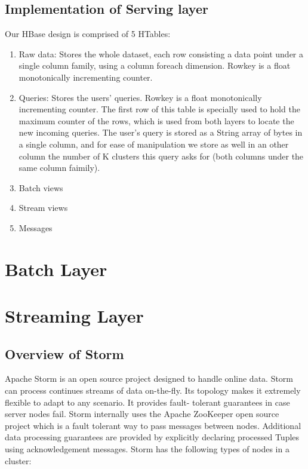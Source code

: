 \documentclass{lmproj}
\begin{document}
\subsection{Implementation of Serving layer}

Our HBase design is comprised of 5 HTables:

\begin{enumerate}
	\item Raw data: Stores the whole dataset, each row consisting a data point under a single column family, using a column foreach dimension. Rowkey is a float monotonically incrementing counter.
	\item Queries: Stores the users' queries. Rowkey is a float monotonically incrementing counter. The first row of this table is specially used to hold the maximum counter of the rows, which is used from both layers to locate the new incoming queries. The user's query is stored as a String array of bytes in a single column, and for ease of manipulation we store as well in an other column the number of K clusters this query asks for (both columns under the same column faimily).
	\item Batch views
	\item Stream views
	\item Messages
\end{enumerate}





\section{Batch Layer}
\label{systemdescr}

\section{Streaming Layer}
\label{systemdescr}

\subsection{Overview of Storm}

Apache Storm is an open source project designed to handle online data. Storm can process continues streams of data on-the-fly.  Its topology makes it extremely flexible to adapt to any scenario. It provides fault- tolerant guarantees in case server nodes fail. Storm internally uses the Apache ZooKeeper open source project which is a fault tolerant way to pass messages between nodes. Additional data processing guarantees are provided by explicitly declaring processed Tuples using acknowledgement messages. Storm has the following types of nodes in a cluster:
\end{document}
